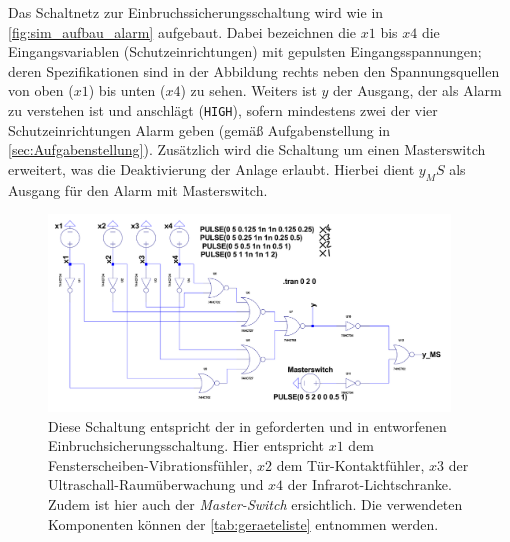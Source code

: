 \documentclass[12pt,english,ngerman]{scrartcl}
\begin{document}
Das Schaltnetz zur Einbruchssicherungsschaltung wird wie in \autoref{fig:sim_aufbau_alarm}
aufgebaut. Dabei bezeichnen die $x1$ bis $x4$ die Eingangsvariablen (Schutzeinrichtungen) mit
gepulsten Eingangsspannungen; deren Spezifikationen sind in der Abbildung rechts neben
den Spannungsquellen von oben ($x1$) bis unten ($x4$) zu sehen. Weiters ist $y$
der Ausgang, der als Alarm zu verstehen ist und anschlägt (\texttt{HIGH}), sofern mindestens zwei
der vier Schutzeinrichtungen Alarm geben (gemäß Aufgabenstellung in
\autoref{sec:Aufgabenstellung}). Zusätzlich wird die Schaltung um einen
Masterswitch erweitert, was die Deaktivierung der Anlage erlaubt. Hierbei dient
$y_MS$ als Ausgang für den Alarm mit Masterswitch.
\begin{figure}[H]
  \centering
    \includegraphics[width=0.95\textwidth]{./simdaten_lab/logic/alarmaufbau.pdf}
    \caption{Diese Schaltung entspricht der in
     geforderten und in
   entworfenen Einbruchsicherungsschaltung. Hier
  entspricht $x1$ dem Fensterscheiben-Vibrationsfühler, $x2$ dem
  Tür-Kontaktfühler, $x3$ der Ultraschall-Raumüberwachung und $x4$ der
  Infrarot-Lichtschranke. Zudem ist hier auch der \textit{Master-Switch}
ersichtlich. Die verwendeten Komponenten können der \autoref{tab:geraeteliste}
entnommen werden.}
  \label{fig:sim_aufbau_alarm}
\end{figure}
\end{document}
